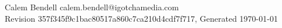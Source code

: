 \documentclass[11pt]{scrartcl}
\begin{document}
	
	\hspace{1em}
	\vspace{2em} \\
	
	\begin{center}
		\begin{LARGE}
		 \\ \vspace{1em}
		\end{LARGE}

		Calem Bendell calem.bendell@igotchamedia.com \\
		Revision 357f345f9c1bac80517a860c7ca210d4cdf7f717, Generated \today
	\end{center}

	\tableofcontents

	
\end{document}
